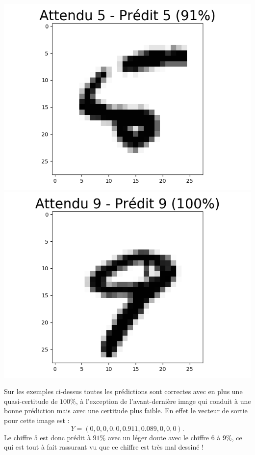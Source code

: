 \documentclass[11pt,class=report,crop=false]{standalone}
\begin{document}
\begin{center}
\includegraphics[scale=\myscale,scale=0.20]{figures/tfconv-chiffre-test-result-8}
\includegraphics[scale=\myscale,scale=0.20]{figures/tfconv-chiffre-test-result-9}
\end{center}

Sur les exemples ci-dessus toutes les prédictions sont correctes avec en plus une quasi-certitude de $100\%$, à l'exception de l'avant-dernière image qui conduit à une bonne prédiction mais avec une certitude plus faible.
En effet le vecteur de sortie pour cette image est :
$$Y = (0, 0, 0, 0, 0, 0.911, 0.089, 0, 0, 0).$$
Le chiffre $5$ est donc prédit à $91\%$ avec un léger doute avec le chiffre $6$ à $9\%$, ce qui est tout à fait rassurant vu que ce chiffre est très mal dessiné !
\end{document}
